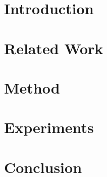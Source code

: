 \begin{abstract}
\lipsum[1-2]
\end{abstract}

\section{Introduction}
\lipsum \cite{Goodfellow2014Generative}

\section{Related Work}
\lipsum

\section{Method}
\lipsum

\section{Experiments}
\lipsum

\section{Conclusion}
\lipsum
